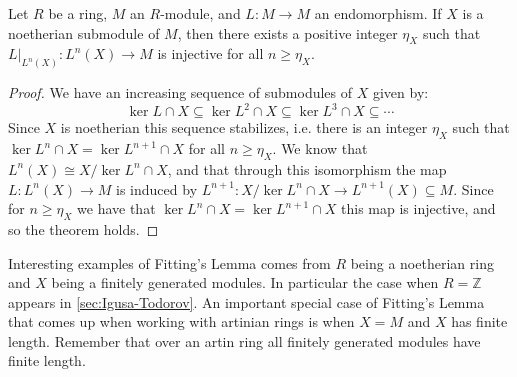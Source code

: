 \begin{theorem}
	Let $R$ be a ring, $M$ an $R$-module, and $L\colon M \to M$ an endomorphism. If $X$ is a noetherian submodule of $M$, then there exists a positive integer $\eta_X$ such that $L|_{L^n(X)}\colon L^n(X) \to M$ is injective for all $n \geq \eta_X$.
	\begin{proof}
		We have an increasing sequence of submodules of $X$ given by:
		$$\ker L \cap X \subseteq \ker L^2 \cap X \subseteq \ker L^3 \cap X \subseteq \cdots$$
		Since $X$ is noetherian this sequence stabilizes, i.e. there is an integer $\eta_X$ such that $\ker L^n \cap X = \ker L^{n+1} \cap X$ for all $n \geq \eta_X$. We know that $L^n(X) \cong X / \ker L^n \cap X$, and that through this isomorphism the map $L \colon L^n(X) \to M$ is induced by $L^{n+1} \colon X / \ker L^n \cap X \to L^{n+1}(X) \subseteq M$. Since for $n \geq \eta_X$ we have that $\ker L^n \cap X = \ker L^{n+1}\cap X$ this map is injective, and so the theorem holds.
	\end{proof}
\end{theorem}

Interesting examples of Fitting's Lemma comes from $R$ being a noetherian ring and $X$ being a finitely generated modules. In particular the case when $R = \mathbb Z$ appears in \cref{sec:Igusa-Todorov}. An important special case of Fitting's Lemma that comes up when working with artinian rings is when $X=M$ and $X$ has finite length. Remember that over an artin ring all finitely generated modules have finite length.

